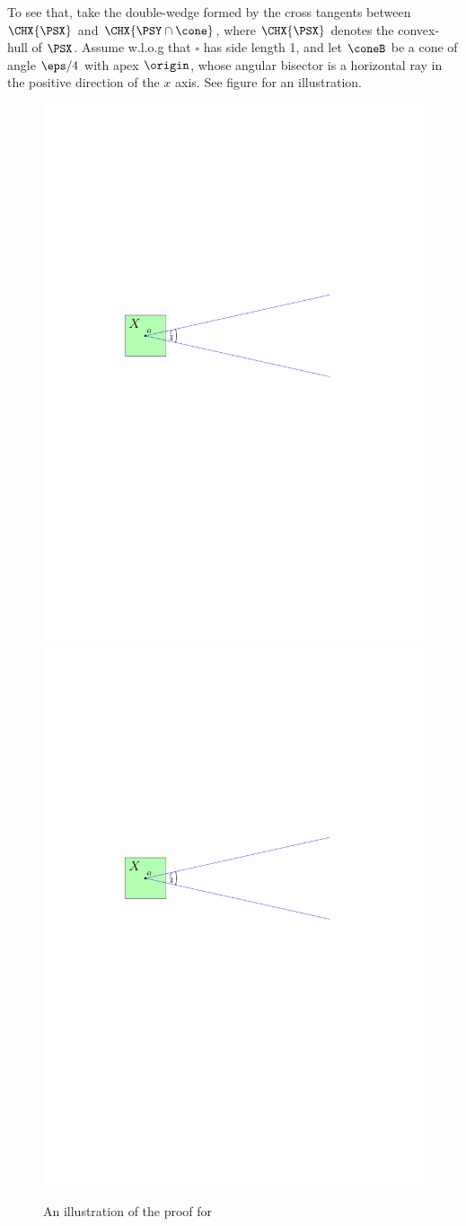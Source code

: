                To see that, take the double-wedge formed by the cross tangents
                between $\CHX{\PSX}$ and $\CHX{\PSY \cap \cone}$, where
                $\CHX{\PSX}$ denotes the convex-hull of $\PSX$. Assume w.l.o.g
                that $\square$ has side length 1, and let $\coneB$ be a cone of
                angle $\eps / 4$ with apex $\origin$, whose angular bisector is a
                horizontal ray in the positive direction of the $x$ axis. See
                figure  for an illustration.
                
                \begin{figure}[h]
                        \phantom{}\hfill%
                        \includegraphics[page=2,
                        width=0.48\linewidth]{../figs/double_wedge}%
                        \hfill%
                        \includegraphics[page=3,
                        width=0.48\linewidth]{../figs/double_wedge}%
                        \hfill%
                        \phantom{}%
                        \caption{An illustration of the proof for }
                \end{figure}
                
